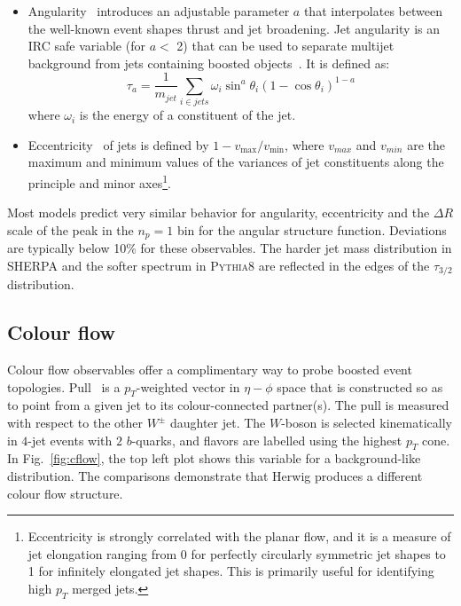 \begin{itemize}
\item Angularity~\cite{Berger:2003iw} introduces an adjustable parameter
$a$ that interpolates between the well-known event shapes thrust 
and jet broadening. Jet angularity is an IRC safe variable (for $a<$ 2) 
that can be used to separate multijet background from jets
containing boosted objects~\cite{Almeida:2008yp}.
It is defined as:
\[ \tau_a = \frac{1}{m_{jet}} \sum\limits_{i\in jets} \omega_i \sin ^a \theta_i (1 - \cos \theta_i)^{1-a}  \]
where $\omega_i$ is the energy of a constituent of the jet.


\item 
Eccentricity~\cite{Chekanov:2010vc} of jets is defined by 
$1-v_{\text{max}}/v_{\text{min}}$, 
where $v_{max}$ and $v_{min}$ are the maximum and minimum values
of the  variances of jet constituents along the principle and minor 
axes\footnote{Eccentricity is strongly correlated with the 
planar flow, and it is a measure of jet elongation ranging
from 0 for perfectly circularly symmetric jet shapes to 1 for 
infinitely elongated jet shapes. This is primarily useful for
identifying high $p_T$ merged jets.}.

\end{itemize}

Most models predict very similar behavior for angularity, eccentricity
and the $\Delta R$ scale of the peak in the $n_p=1$ bin for the angular structure function.
Deviations are typically below 10\% for these observables.
The harder jet mass distribution in \textsc{SHERPA} and the softer spectrum
in \textsc{Pythia8} are reflected in the edges of the $\tau_{3/2}$ 
distribution.






\subsection{Colour flow}



Colour flow observables offer a complimentary way to probe boosted event 
topologies. Pull~\cite{Gallicchio:2010sw} is a $p_T$-weighted vector in 
$\eta-\phi$ space that is constructed so as to point from a given jet to 
its colour-connected partner(s). The pull is measured with 
respect to the other $W^\pm$ daughter jet. 
The $W$-boson is selected kinematically in $4$-jet events with $2$ 
$b$-quarks, and flavors are labelled using the highest $p_T$ cone.
In Fig.~\ref{fig:cflow}, the top left plot 
shows this variable for a background-like distribution. 
The comparisons demonstrate 
that Herwig produces a different colour flow structure.

